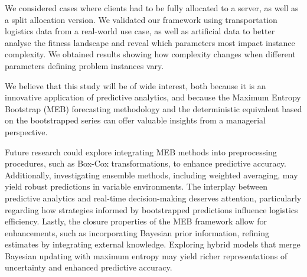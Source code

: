 \documentclass[ijoc,sglanonrev]{informs4}
\begin{document}
We considered cases where clients had to be fully allocated to a server, as well as a split allocation version. We validated our framework using transportation logistics data from a real-world use case, as well as artificial data to better analyse the fitness landscape and reveal which parameters most impact instance complexity. We obtained results showing how complexity changes when different parameters defining problem instances vary.

We believe that this study will be of wide interest, both because it is an innovative application of predictive analytics, and because the Maximum Entropy Bootstrap (MEB) forecasting methodology and the deterministic equivalent based on the bootstrapped series can offer valuable insights from a managerial perspective.

Future research could explore integrating MEB methods into preprocessing procedures, such as Box-Cox transformations, to enhance predictive accuracy. Additionally, investigating ensemble methods, including weighted averaging, may yield robust predictions in variable environments. The interplay between predictive analytics and real-time decision-making deserves attention, particularly regarding how strategies informed by bootstrapped predictions influence logistics efficiency. Lastly, the closure properties of the MEB framework allow for enhancements, such as incorporating Bayesian prior information, refining estimates by integrating external knowledge. Exploring hybrid models that merge Bayesian updating with maximum entropy may yield richer representations of uncertainty and enhanced predictive accuracy.

\end{document}
